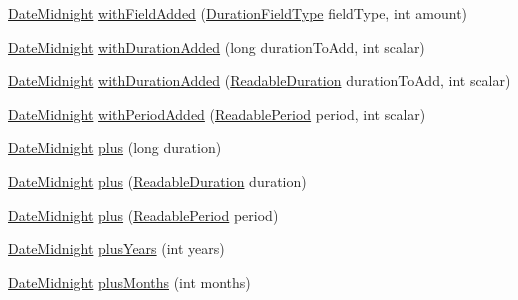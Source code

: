 \begin{DoxyCompactItemize}
\item 
\hyperlink{classorg_1_1joda_1_1time_1_1_date_midnight}{Date\-Midnight} \hyperlink{classorg_1_1joda_1_1time_1_1_date_midnight_abd27c8703b0a4cd67e8eb7330e9888f9}{with\-Field\-Added} (\hyperlink{classorg_1_1joda_1_1time_1_1_duration_field_type}{Duration\-Field\-Type} field\-Type, int amount)
\item 
\hyperlink{classorg_1_1joda_1_1time_1_1_date_midnight}{Date\-Midnight} \hyperlink{classorg_1_1joda_1_1time_1_1_date_midnight_ac0220a963447e10f8043808e3971c511}{with\-Duration\-Added} (long duration\-To\-Add, int scalar)
\item 
\hyperlink{classorg_1_1joda_1_1time_1_1_date_midnight}{Date\-Midnight} \hyperlink{classorg_1_1joda_1_1time_1_1_date_midnight_a24902101d1caaaff7d7611f1d16fa04b}{with\-Duration\-Added} (\hyperlink{interfaceorg_1_1joda_1_1time_1_1_readable_duration}{Readable\-Duration} duration\-To\-Add, int scalar)
\item 
\hyperlink{classorg_1_1joda_1_1time_1_1_date_midnight}{Date\-Midnight} \hyperlink{classorg_1_1joda_1_1time_1_1_date_midnight_ae7e49029dc3ff516c373e8be9a5c70a0}{with\-Period\-Added} (\hyperlink{interfaceorg_1_1joda_1_1time_1_1_readable_period}{Readable\-Period} period, int scalar)
\item 
\hyperlink{classorg_1_1joda_1_1time_1_1_date_midnight}{Date\-Midnight} \hyperlink{classorg_1_1joda_1_1time_1_1_date_midnight_ab0daaba28583f1ac450ed99a28d1dac7}{plus} (long duration)
\item 
\hyperlink{classorg_1_1joda_1_1time_1_1_date_midnight}{Date\-Midnight} \hyperlink{classorg_1_1joda_1_1time_1_1_date_midnight_ae2b8028cec151ad08c0b2abcc92abe00}{plus} (\hyperlink{interfaceorg_1_1joda_1_1time_1_1_readable_duration}{Readable\-Duration} duration)
\item 
\hyperlink{classorg_1_1joda_1_1time_1_1_date_midnight}{Date\-Midnight} \hyperlink{classorg_1_1joda_1_1time_1_1_date_midnight_a4226448cda7c80fa8e1c631fe7fd2aa8}{plus} (\hyperlink{interfaceorg_1_1joda_1_1time_1_1_readable_period}{Readable\-Period} period)
\item 
\hyperlink{classorg_1_1joda_1_1time_1_1_date_midnight}{Date\-Midnight} \hyperlink{classorg_1_1joda_1_1time_1_1_date_midnight_ad1ddd458418241c6db821a80fdc609ad}{plus\-Years} (int years)
\item 
\hyperlink{classorg_1_1joda_1_1time_1_1_date_midnight}{Date\-Midnight} \hyperlink{classorg_1_1joda_1_1time_1_1_date_midnight_af05774bde4da49f4c58c883269610b15}{plus\-Months} (int months)
\item 

\end{DoxyCompactItemize}

